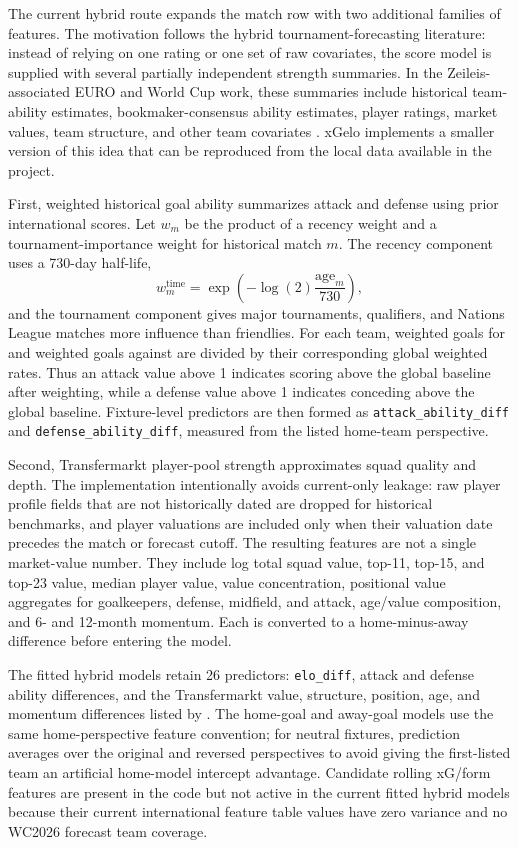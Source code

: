 \documentclass[11pt]{article}
\begin{document}
The current hybrid route expands the match row with two additional families of
features. The motivation follows the hybrid tournament-forecasting literature:
instead of relying on one rating or one set of raw covariates, the score model
is supplied with several partially independent strength summaries. In the
Zeileis-associated EURO and World Cup work, these summaries include historical
team-ability estimates, bookmaker-consensus ability estimates, player ratings,
market values, team structure, and other team covariates
\cite{leitner2010,groll2015,groll2019wwc,groll2021euro2020,groll2024euro2024}.
xGelo implements a smaller version of this idea that can be reproduced from the
local data available in the project.

First, weighted historical goal ability summarizes attack and defense using
prior international scores. Let $w_m$ be the product of a recency weight and a
tournament-importance weight for historical match $m$. The recency component
uses a 730-day half-life,
\[
w_m^{\mathrm{time}} = \exp\left(-\log(2)
  \frac{\mathrm{age}_m}{730}\right),
\]
and the tournament component gives major tournaments, qualifiers, and Nations
League matches more influence than friendlies. For each team, weighted goals
for and weighted goals against are divided by their corresponding global
weighted rates. Thus an attack value above 1 indicates scoring above the global
baseline after weighting, while a defense value above 1 indicates conceding
above the global baseline. Fixture-level predictors are then formed as
\texttt{attack\_ability\_diff} and \texttt{defense\_ability\_diff}, measured
from the listed home-team perspective.

Second, Transfermarkt player-pool strength approximates squad quality and depth.
The implementation intentionally avoids current-only leakage: raw player profile
fields that are not historically dated are dropped for historical benchmarks,
and player valuations are included only when their valuation date precedes the
match or forecast cutoff. The resulting features are not a single market-value
number. They include log total squad value, top-11, top-15, and top-23 value,
median player value, value concentration, positional value aggregates for
goalkeepers, defense, midfield, and attack, age/value composition, and 6- and
12-month momentum. Each is converted to a home-minus-away difference before
entering the model.

The fitted hybrid models retain 26 predictors: \texttt{elo\_diff}, attack and
defense ability differences, and the Transfermarkt value, structure, position,
age, and momentum differences listed by . The
home-goal and away-goal models use the same home-perspective feature convention;
for neutral fixtures, prediction averages over the original and reversed
perspectives to avoid giving the first-listed team an artificial home-model
intercept advantage. Candidate rolling xG/form features are present in the code
but not active in the current fitted hybrid models because their current
international feature table values have zero variance and no WC2026 forecast
team coverage.
\end{document}
